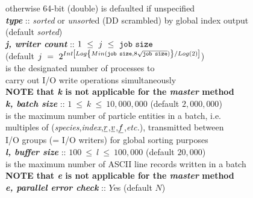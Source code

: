 \begin{tabbing}
\>                                              \> \phantom{x} otherwise 64-bit (double) is defaulted if unspecified \\
\>                                              \> {\bf \em type} :: {\em sorted} or {\em unsort}ed (DD scrambled) by global index output \\
\>                                              \> \phantom{x} (default {\em sorted}) \\
\>                                              \> \phantom{xxx} {\bf \em j, writer count} :: $1~\le~j~\le~{\tt job~size}$ \\
\>                                              \> \phantom{xxxx} (default $j~=~2^{Int\left[Log\left\{Min({\tt job~size},8\sqrt{\tt job~size})\right\}/Log(2)\right]}$) \\
\>                                              \> \phantom{xxxx} is the designated number of processes to \\
\>                                              \> \phantom{xxxx} carry out I/O write operations simultaneously \\
\>                                              \> {\bf NOTE that {\em k} is not applicable for the {\em master} method} \\
\>                                              \> \phantom{xxx} {\bf \em k, batch size} :: $1~\le~k~\le~10,000,000$ (default $2,000,000$) \\
\>                                              \> \phantom{xxxx} is the maximum number of particle entities in a batch, i.e. \\
\>                                              \> \phantom{xxxx} multiples of ({\em species},{\em index},$\mbox{$\underline{r}$}$,$\mbox{$\underline{v}$}$,$\mbox{$\underline{f}$}$,{\em etc.}), transmitted between \\
\>                                              \> \phantom{xxxx} I/O groups (= I/O writers) for global sorting purposes \\
\>                                              \> {\bf \em l, buffer size} :: $100~\le~l~\le~100,000$ (default $20,000$) \\
\>                                              \> \phantom{x} is the maximum number of ASCII line records written in a batch \\
\>                                              \> {\bf NOTE that {\em e} is not applicable for the {\em master} method} \\
\>                                              \> \phantom{xxx} {\bf \em e, parallel error check} :: $Y$es (default $N$) \\

\end{tabbing}
